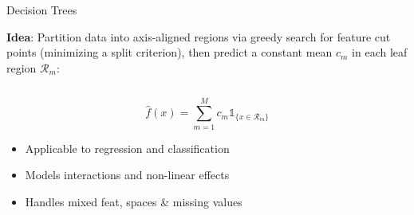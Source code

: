 \documentclass[10pt,compress,t,notes=noshow, xcolor=table]{beamer}
\date{}
\begin{document}
\titlemeta{
Interpretable Machine Learning 
}{
Rule-based Models
}{
figure/tree_surface2.png
}{
\item Decision trees
\item RuleFit
\item Decision rules
}

\begin{frame}{Decision Trees }


\textbf{Idea}: 
Partition data into axis-aligned regions via greedy search for feature cut points (minimizing a split criterion), then predict a constant mean $c_m$ in each leaf region $\mathcal{R}_m$:

\begin{columns}[T, totalwidth=\textwidth]

\begin{column}{0.65\textwidth}
$$
\textstyle\hat f(x) = \sum\limits_{m=1}^M c_m \mathds{1}_{\{x \in \mathcal{R}_m\}}
$$

\pause
\begin{itemize}
    \item Applicable to regression and classification
    \item Models interactions and non-linear effects
    \item Handles mixed feat, spaces \& missing values
\end{itemize}


\end{column}
\end{columns}
\end{frame}
\end{document}
